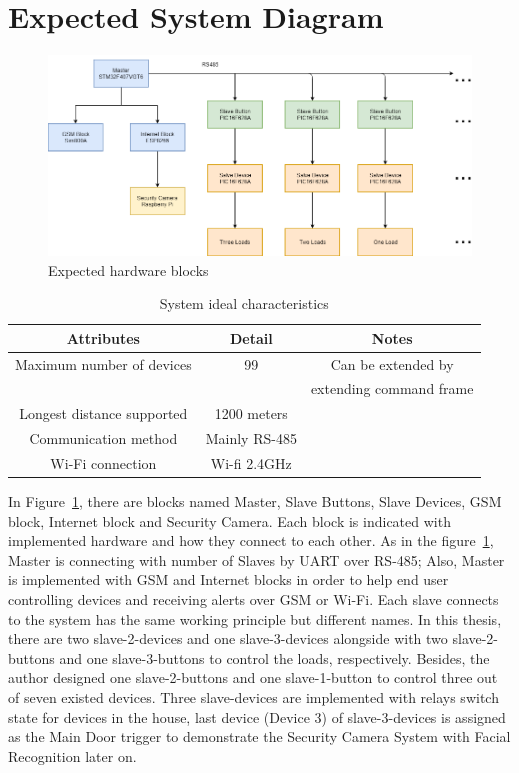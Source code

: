 \section{Expected System Diagram}
\begin{figure}[!ht]
    \includegraphics[scale=0.5]{images/hardwareBlock.png}
    \caption{Expected hardware blocks}
    \label{fig:hardwareBlock}
\end{figure}

    \begin{table}[h!]
    \begin{center}
    \begin{tabular}{ |c||c||c|  }
      \hline
      Attributes & Detail & Notes\\
      \hline
      Maximum number of devices&   99& Can be extended by\\
      & &extending command frame\\
      \hline
      Longest distance supported&   1200 meters&\\
      \hline
      Communication method &Mainly RS-485&\\
      \hline
      Wi-Fi connection & Wi-fi 2.4GHz&\\
      \hline
     \end{tabular}
     \caption{System ideal characteristics}
     \label{table:idealCharacteristics}
    \end{center}
    \end{table}
    In Figure~\ref{fig:hardwareBlock}, there are blocks named Master, Slave Buttons, Slave Devices, GSM block, Internet block and Security Camera. Each block is indicated with implemented hardware and how they connect to each other. As in the figure~\ref{fig:hardwareBlock}, Master is connecting with number of Slaves by UART over RS-485; Also, Master is implemented with GSM and Internet blocks in order to help end user controlling devices and receiving alerts over GSM or Wi-Fi. Each slave connects to the system has the same working principle but different names. In this thesis, there are two slave-2-devices and one slave-3-devices alongside with two slave-2-buttons and one slave-3-buttons to control the loads, respectively. Besides, the author designed one slave-2-buttons and one slave-1-button to control three out of seven existed devices. Three slave-devices are implemented with relays switch state for devices in the house, last device (Device 3) of slave-3-devices is assigned as the Main Door trigger to demonstrate the Security Camera System with Facial Recognition later on.

